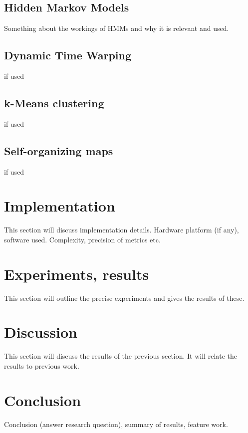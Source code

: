 \documentclass[a4paper,10pt]{extarticle}
\begin{document}
  \subsection{Hidden Markov Models}
  Something about the workings of HMMs and why it is relevant and used.

  \subsection{Dynamic Time Warping}
  if used

  \subsection{k-Means clustering}
  if used

  \subsection{Self-organizing maps}
  if used


\section{Implementation}
This section will discuss implementation details. Hardware platform (if any), software used. Complexity, precision of metrics etc.

\section{Experiments, results}
This section will outline the precise experiments and gives the results of these.

\section{Discussion}
This section will discuss the results of the previous section. It will relate the results to previous work.

\section{Conclusion}
Conclusion (answer research question), summary of results, feature work.
\end{document}

